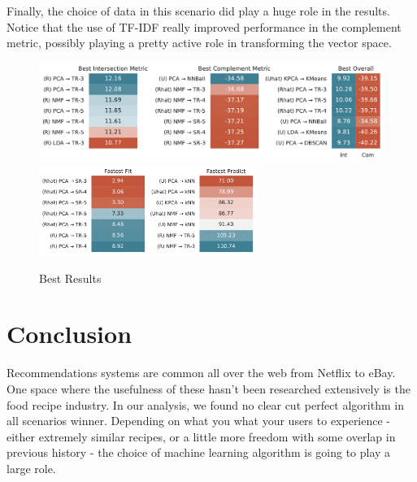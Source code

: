 \documentclass[11pt]{article}
\begin{document}
Finally, the choice of data in this scenario did play a huge role in the results. Notice that the use of TF-IDF really improved performance in the complement metric, possibly playing a pretty active role in transforming the vector space.  
\begin{figure}[b!]
\centering
\includegraphics[width=1\textwidth]{figs/best_metric.pdf}
\includegraphics[width=0.63\textwidth]{figs/best_time.pdf}
\caption{Best Results}
\label{fig:best}
\end{figure}

\section{Conclusion}

Recommendations systems are common all over the web from Netflix to eBay. One space where the usefulness of these hasn't been researched extensively is the food recipe industry. In our analysis, we found no clear cut perfect algorithm in all scenarios winner. Depending on what you what your users to experience - either extremely similar recipes, or a little more freedom with some overlap in previous history - the choice of machine learning algorithm is going to play a large role. 


\end{document}
